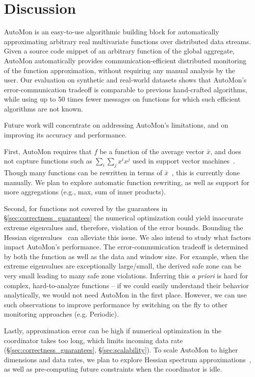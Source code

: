\section{Discussion} \label{sec:discussion}
AutoMon is an easy-to-use algorithmic building block for automatically approximating arbitrary real multivariate functions over distributed data streams.
Given a source code snippet of an arbitrary function of the global aggregate, AutoMon automatically provides communication-efficient distributed monitoring of the function approximation, without requiring any manual analysis by the user.
Our evaluation on synthetic and real-world datasets shows that AutoMon's error-communication tradeoff is comparable to previous hand-crafted algorithms, while using up to 50 times fewer messages on functions for which such efficient algorithms are not known.


Future work will concentrate on addressing AutoMon's limitations, and on improving its accuracy and performance.

First, AutoMon requires that $f$ be a function of the average vector $\bar{x}$, and does not capture functions such as $\sum_i \sum_j x^i x^j$ used in support vector machines~\cite{steinwart2008support}.
Though many functions can be rewritten in terms of $\bar{x}$~\cite{garofalakis2013sketch, lazerson:lightweight_monitoring, lazerson:one_for_all, gabel:entropy_approximation, papapetrou2014skylines, gabel:monitoring_least_squares}, %
this is currently done manually.
We plan to explore automatic function rewriting, as well as support for more aggregations (e.g., max, sum of inner products).

Second, for functions not covered by the guarantees in \S\ref{sec:correctness_guarantees} the numerical optimization could yield inaccurate extreme eigenvalues and, therefore, violation of the error bounds.
Bounding the Hessian eigenvalues~\cite{2008_bound_hessian_eigenvalues,interval_matrix_branch_and_bound} can alleviate this issue. 
%
We also intend to study what factors impact AutoMon's performance.
The error-communication tradeoff is determined by both the function as well as the data and window size.
For example, when the extreme eigenvalues are exceptionally large/small, the derived safe zone can be very small leading to many safe zone violations.
Inferring this \emph{a priori} is hard for complex, hard-to-analyze functions -- if we could easily understand their behavior analytically, we would not need AutoMon in the first place.
However, we can use such observations to improve performance by switching on the fly to other monitoring approaches (e.g. Periodic).


Lastly, approximation error can be high if numerical optimization in the coordinator takes too long, which limits incoming data rate (\S\ref{sec:correctness_guarantees}, \S\ref{sec:scalability}).
To scale AutoMon to higher dimensions and data rates, we plan to explore Hessian spectrum approximations~\cite{lanczos_algo},
as well as pre-computing future constraints when the coordinator is idle.
